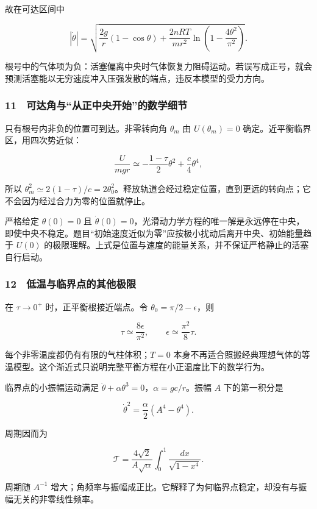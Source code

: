 \documentclass[12pt,a4paper,fontset=fandol]{ctexart}
\begin{document}
故在可达区间中

\[\boxed{|\dot\theta|=
\sqrt{\frac{2g}{r}(1-\cos\theta)
+\frac{2nRT}{mr^2}\ln\left(1-\frac{4\theta^2}{\pi^2}\right)}.}\]

根号中的气体项为负：活塞偏离中央时气体恢复力阻碍运动。若误写成正号，就会预测活塞能以无穷速度冲入压强发散的端点，违反本模型的受力方向。

\subsubsection{11　可达角与``从正中央开始''的数学细节}\label{ux53efux8fbeux89d2ux4e0eux4eceux6b63ux4e2dux592eux5f00ux59cbux7684ux6570ux5b66ux7ec6ux8282}

只有根号内非负的位置可到达。非零转向角 \(\theta_m\) 由 \(U(\theta_m)=0\)
确定。近平衡临界区，用四次势近似：

\[\frac{U}{mgr}\simeq-\frac{1-\tau}{2}\theta^2+\frac c4\theta^4,\]

所以
\(\theta_m^2\simeq2(1-\tau)/c=2\theta_0^2\)。释放轨道会经过稳定位置，直到更远的转向点；它不会因为经过合力为零的位置就停止。

严格给定 \(\theta(0)=0\) 且
\(\dot\theta(0)=0\)，光滑动力学方程的唯一解是永远停在中央，即使中央不稳定。题目``初始速度近似为零''应按极小扰动后离开中央、初始能量趋于
\(U(0)\)
的极限理解。上式是位置与速度的能量关系，并不保证严格静止的活塞自行启动。

\noindent\begin{minipage}{\linewidth}
\subsubsection{12　低温与临界点的其他极限}\label{ux4f4eux6e29ux4e0eux4e34ux754cux70b9ux7684ux5176ux4ed6ux6781ux9650}

在 \(\tau\to0^+\) 时，正平衡根接近端点。令
\(\theta_0=\pi/2-\epsilon\)，则

\[\tau\simeq\frac{8\epsilon}{\pi^2},\qquad
\epsilon\simeq\frac{\pi^2}{8}\tau.\]

每个非零温度都仍有有限的气柱体积；\(T=0\)
本身不再适合照搬经典理想气体的等温模型。这个渐近式只说明完整平衡方程在小正温度比下的数学行为。

临界点的小振幅运动满足
\(\ddot\theta+\alpha\theta^3=0\)，\(\alpha=gc/r\)。振幅 \(A\)
下的第一积分是

\[\dot\theta^2=\frac\alpha2(A^4-\theta^4).\]

周期因而为

\[\mathcal T=\frac{4\sqrt2}{A\sqrt\alpha}
\int_0^1\frac{dx}{\sqrt{1-x^4}}.\]

周期随 \(A^{-1}\)
增大；角频率与振幅成正比。它解释了为何临界点稳定，却没有与振幅无关的非零线性频率。


\end{minipage}
\end{document}
